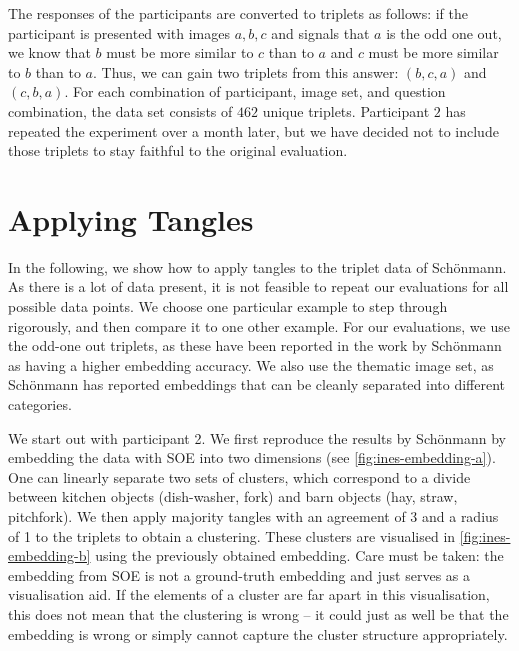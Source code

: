 The responses of the participants are converted to triplets as follows: if the participant is presented with images $a, b, c$ and signals that $a$ is the odd one out, 
we know that $b$ must be more similar to $c$ than to $a$ and $c$ must be more similar to $b$ than to $a$. Thus, we can gain two triplets from this answer: $(b,c,a)$ and $(c,b,a)$.
For each combination of participant, image set, and question combination, the data set consists of $462$ unique triplets. 
Participant $2$ has repeated the experiment over a month later, but we have decided not to include those triplets to stay faithful to the original evaluation.

\section{Applying Tangles}
In the following, we show how to apply tangles to the triplet data of Schönmann.
As there is a lot of data present, it is not feasible to repeat our evaluations for all possible data points.
We choose one particular example to step through rigorously, and then compare it to one other example. 
For our evaluations, we use the odd-one out triplets, as these have been reported in the work by Schönmann as 
having a higher embedding accuracy. We also use the thematic image set, as Schönmann has reported embeddings that can be cleanly 
separated into different categories.

We start out with participant 2. We first reproduce the results by Schönmann by embedding the data with SOE into two dimensions 
(see \autoref{fig:ines-embedding-a}). One can linearly separate two sets of clusters, which correspond to a divide between kitchen objects 
(dish-washer, fork) and barn objects (hay, straw, pitchfork).  We then apply majority tangles with an agreement of 3 and a radius of 1 to the 
triplets to obtain a clustering. These clusters are visualised in \autoref{fig:ines-embedding-b} using the previously obtained embedding. Care must be taken: the embedding
from SOE is not a ground-truth embedding and just serves as a visualisation aid. If the elements of a cluster are far 
apart in this visualisation, this does not mean that the clustering is wrong – it could just as well be that the embedding is wrong or simply cannot capture
the cluster structure appropriately. 

